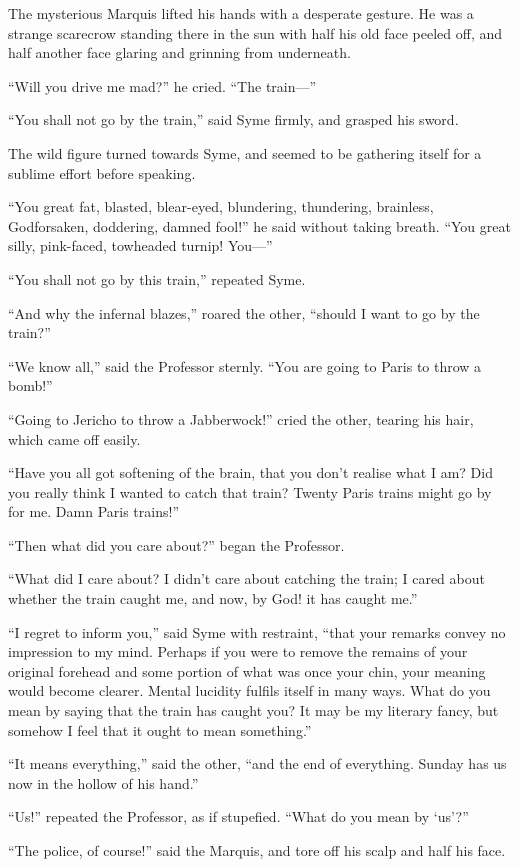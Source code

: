 The mysterious Marquis lifted his hands with a desperate gesture. He was a strange scarecrow standing there in the sun with half his old face peeled off, and half another face glaring and grinning from underneath.

“Will you drive me mad?” he cried. “The train⁠—”

“You shall not go by the train,” said Syme firmly, and grasped his sword.

The wild figure turned towards Syme, and seemed to be gathering itself for a sublime effort before speaking.

“You great fat, blasted, blear-eyed, blundering, thundering, brainless, Godforsaken, doddering, damned fool!” he said without taking breath. “You great silly, pink-faced, towheaded turnip! You⁠—”

“You shall not go by this train,” repeated Syme.

“And why the infernal blazes,” roared the other, “should I want to go by the train?”

“We know all,” said the Professor sternly. “You are going to Paris to throw a bomb!”

“Going to Jericho to throw a Jabberwock!” cried the other, tearing his hair, which came off easily.

“Have you all got softening of the brain, that you don’t realise what I am? Did you really think I wanted to catch that train? Twenty Paris trains might go by for me. Damn Paris trains!”

“Then what did you care about?” began the Professor.

“What did I care about? I didn’t care about catching the train; I cared about whether the train caught me, and now, by God! it has caught me.”

“I regret to inform you,” said Syme with restraint, “that your remarks convey no impression to my mind. Perhaps if you were to remove the remains of your original forehead and some portion of what was once your chin, your meaning would become clearer. Mental lucidity fulfils itself in many ways. What do you mean by saying that the train has caught you? It may be my literary fancy, but somehow I feel that it ought to mean something.”

“It means everything,” said the other, “and the end of everything. Sunday has us now in the hollow of his hand.”

“Us!” repeated the Professor, as if stupefied. “What do you mean by ‘us’?”

“The police, of course!” said the Marquis, and tore off his scalp and half his face.

